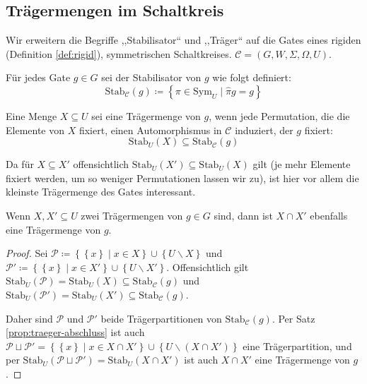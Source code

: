 \subsection{Trägermengen im Schaltkreis}

Wir erweitern die Begriffe ,,Stabilisator`` und ,,Träger`` auf
die Gates eines rigiden (Definition \ref{def:rigid}), symmetrischen
Schaltkreises. $\mathcal{C}=\left(G,W,\Sigma,\Omega,U\right)$.
\begin{defn}
Für jedes Gate $g\in G$ sei der Stabilisator von $g$ wie folgt definiert:
\[
\mathrm{Stab}_{\mathcal{C}}\left(g\right)\coloneqq\left\{ \pi\in\mathrm{Sym}_{U}\mid\hat{\pi}g=g\right\} 
\]

Eine Menge $X\subseteq U$ sei eine Trägermenge von $g$, wenn jede
Permutation, die die Elemente von $X$ fixiert, einen Automorphismus
in $\mathcal{C}$ induziert, der $g$ fixiert: 
\[
\mathrm{Stab}_{U}\left(X\right)\subseteq\mathrm{Stab}_{\mathcal{C}}\left(g\right)
\]
\end{defn}
Da für $X\subseteq X'$ offensichtlich $\mathrm{Stab}_{U}\left(X'\right)\subseteq\mathrm{Stab}_{U}\left(X\right)$
gilt (je mehr Elemente fixiert werden, um so weniger Permutationen
lassen wir zu), ist hier vor allem die kleinste Trägermenge des Gates
interessant.
\begin{prop}
Wenn $X,X'\subseteq U$ zwei Trägermengen von $g\in G$ sind, dann
ist $X\cap X'$ ebenfalls eine Trägermenge von $g$.
\end{prop}
\begin{proof}
Sei $\mathcal{P}\coloneqq\left\{ \left\{ x\right\} \mid x\in X\right\} \cup\left\{ U\backslash X\right\} $
und $\mathcal{P}'\coloneqq\left\{ \left\{ x\right\} \mid x\in X'\right\} \cup\left\{ U\backslash X'\right\} $.
Offensichtlich gilt $\mathrm{Stab}_{U}\left(\mathcal{P}\right)=\mathrm{Stab}_{U}\left(X\right)\subseteq\mathrm{Stab}_{\mathcal{C}}\left(g\right)$
und $\mathrm{Stab}_{U}\left(\mathcal{P}'\right)=\mathrm{Stab}_{U}\left(X'\right)\subseteq\mathrm{Stab}_{\mathcal{C}}\left(g\right)$.

Daher sind $\mathcal{P}$ und $\mathcal{P}'$ beide Trägerpartitionen
von $\mathrm{Stab}_{\mathcal{C}}\left(g\right)$. Per Satz \ref{prop:traeger-abschluss}
ist auch $\mathcal{P}\sqcup\mathcal{P}'=\left\{ \left\{ x\right\} \mid x\in X\cap X'\right\} \cup\left\{ U\backslash\left(X\cap X'\right)\right\} $
eine Trägerpartition, und per $\mathrm{Stab}_{U}\left(\mathcal{P}\sqcup\mathcal{P}'\right)=\mathrm{Stab}_{U}\left(X\cap X'\right)$
ist auch $X\cap X'$ eine Trägermenge von $g$.
\end{proof}
